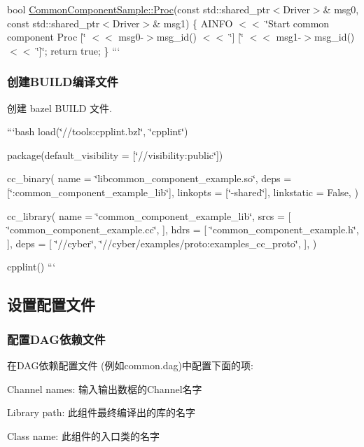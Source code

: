 bool \hyperlink{classCommonComponentSample_ab84ea2f74b8ab92a74733b392319ea5e}{Common\-Component\-Sample\-::\-Proc}(const std\-::shared\-\_\-ptr$<$\-Driver$>$\& msg0, const std\-::shared\-\_\-ptr$<$\-Driver$>$\& msg1) \{ A\-I\-N\-F\-O $<$$<$ \char`\"{}\-Start common component Proc \mbox{[}\char`\"{} $<$$<$ msg0-\/$>$msg\-\_\-id() $<$$<$ \char`\"{}\mbox{]} \mbox{[}\char`\"{} $<$$<$ msg1-\/$>$msg\-\_\-id() $<$$<$ \char`\"{}\mbox{]}\char`\"{}; return true; \} ```

\subsubsection*{创建\-B\-U\-I\-L\-D编译文件}

创建 bazel B\-U\-I\-L\-D 文件.

```bash load(\char`\"{}//tools\-:cpplint.\-bzl\char`\"{}, \char`\"{}cpplint\char`\"{})

package(default\-\_\-visibility = \mbox{[}\char`\"{}//visibility\-:public\char`\"{}\mbox{]})

cc\-\_\-binary( name = \char`\"{}libcommon\-\_\-component\-\_\-example.\-so\char`\"{}, deps = \mbox{[}\char`\"{}\-:common\-\_\-component\-\_\-example\-\_\-lib\char`\"{}\mbox{]}, linkopts = \mbox{[}\char`\"{}-\/shared\char`\"{}\mbox{]}, linkstatic = False, )

cc\-\_\-library( name = \char`\"{}common\-\_\-component\-\_\-example\-\_\-lib\char`\"{}, srcs = \mbox{[} \char`\"{}common\-\_\-component\-\_\-example.\-cc\char`\"{}, \mbox{]}, hdrs = \mbox{[} \char`\"{}common\-\_\-component\-\_\-example.\-h\char`\"{}, \mbox{]}, deps = \mbox{[} \char`\"{}//cyber\char`\"{}, \char`\"{}//cyber/examples/proto\-:examples\-\_\-cc\-\_\-proto\char`\"{}, \mbox{]}, )

cpplint() ``` \subsection*{设置配置文件}

\subsubsection*{配置\-D\-A\-G依赖文件}

在\-D\-A\-G依赖配置文件 (例如common.\-dag)中配置下面的项\-:


\begin{DoxyItemize}
\item Channel names\-: 输入输出数椐的\-Channel名字
\item Library path\-: 此组件最终编译出的库的名字
\item Class name\-: 此组件的入口类的名字
\end{DoxyItemize}

